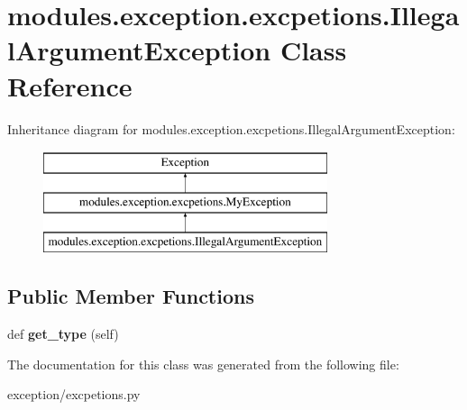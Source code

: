 \hypertarget{classmodules_1_1exception_1_1excpetions_1_1_illegal_argument_exception}{}\section{modules.\+exception.\+excpetions.\+Illegal\+Argument\+Exception Class Reference}
\label{classmodules_1_1exception_1_1excpetions_1_1_illegal_argument_exception}
Inheritance diagram for modules.\+exception.\+excpetions.\+Illegal\+Argument\+Exception\+:\begin{figure}[H]
\begin{center}
\leavevmode
\includegraphics[height=3.000000cm]{classmodules_1_1exception_1_1excpetions_1_1_illegal_argument_exception}
\end{center}
\end{figure}
\subsection*{Public Member Functions}
\begin{DoxyCompactItemize}
\item 
\mbox{\label{classmodules_1_1exception_1_1excpetions_1_1_illegal_argument_exception_abfd04b7b6ca312aa6dc4f623232e9150}} 
def {\bfseries get\+\_\+type} (self)
\end{DoxyCompactItemize}


The documentation for this class was generated from the following file\+:\begin{DoxyCompactItemize}
\item 
exception/excpetions.\+py\end{DoxyCompactItemize}
